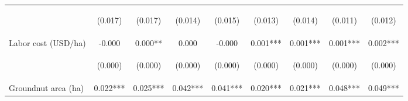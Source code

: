 \begin{center}
\begin{tabular}{lcccccccc}
\vspace{4pt} & \begin{footnotesize}(0.017)\end{footnotesize} & \begin{footnotesize}(0.017)\end{footnotesize} & \begin{footnotesize}(0.014)\end{footnotesize} & \begin{footnotesize}(0.015)\end{footnotesize} & \begin{footnotesize}(0.013)\end{footnotesize} & \begin{footnotesize}(0.014)\end{footnotesize} & \begin{footnotesize}(0.011)\end{footnotesize} & \begin{footnotesize}(0.012)\end{footnotesize} \\
Labor cost (USD/ha) & -0.000 & 0.000** & 0.000 & -0.000 & 0.001*** & 0.001*** & 0.001*** & 0.002*** \\
\vspace{4pt} & \begin{footnotesize}(0.000)\end{footnotesize} & \begin{footnotesize}(0.000)\end{footnotesize} & \begin{footnotesize}(0.000)\end{footnotesize} & \begin{footnotesize}(0.000)\end{footnotesize} & \begin{footnotesize}(0.000)\end{footnotesize} & \begin{footnotesize}(0.000)\end{footnotesize} & \begin{footnotesize}(0.000)\end{footnotesize} & \begin{footnotesize}(0.000)\end{footnotesize} \\
Groundnut area (ha) & 0.022*** & 0.025*** & 0.042*** & 0.041*** & 0.020*** & 0.021*** & 0.048*** & 0.049*** \\

\end{tabular}
\end{center}
